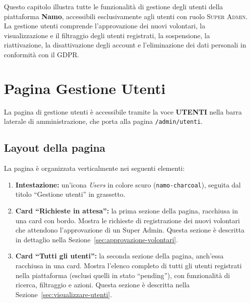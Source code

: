 \documentclass[a4paper,11pt,oneside]{book}
\newcommand{\namo}{\textbf{Namo}}
\newcommand{\menuitem}[1]{\textsf{\textbf{#1}}}
\newcommand{\percorso}[1]{\textcolor{namoCyan}{\texttt{#1}}}
\newcommand{\ruolo}[1]{\textsc{#1}}
\begin{document}
Questo capitolo illustra tutte le funzionalit\`a di gestione degli utenti della piattaforma \namo{}, accessibili esclusivamente agli utenti con ruolo \ruolo{Super Admin}. La gestione utenti comprende l'approvazione dei nuovi volontari, la visualizzazione e il filtraggio degli utenti registrati, la sospensione, la riattivazione, la disattivazione degli account e l'eliminazione dei dati personali in conformit\`a con il GDPR.

\section{Pagina Gestione Utenti}
\label{sec:pagina-gestione-utenti}

La pagina di gestione utenti \`e accessibile tramite la voce \menuitem{UTENTI} nella barra laterale di amministrazione, che porta alla pagina \percorso{/admin/utenti}.

\subsection{Layout della pagina}

La pagina \`e organizzata verticalmente nei seguenti elementi:

\begin{enumerate}[leftmargin=1.5em]
  \item \textbf{Intestazione:} un'icona \textit{Users} in colore scuro (\texttt{namo-charcoal}), seguita dal titolo ``Gestione utenti'' in grassetto.

  \item \textbf{Card ``Richieste in attesa'':} la prima sezione della pagina, racchiusa in una card con bordo. Mostra le richieste di registrazione dei nuovi volontari che attendono l'approvazione di un Super Admin. Questa sezione \`e descritta in dettaglio nella Sezione~\ref{sec:approvazione-volontari}.

  \item \textbf{Card ``Tutti gli utenti'':} la seconda sezione della pagina, anch'essa racchiusa in una card. Mostra l'elenco completo di tutti gli utenti registrati nella piattaforma (esclusi quelli in stato ``pending''), con funzionalit\`a di ricerca, filtraggio e azioni. Questa sezione \`e descritta nella Sezione~\ref{sec:visualizzare-utenti}.
\end{enumerate}
\end{document}

